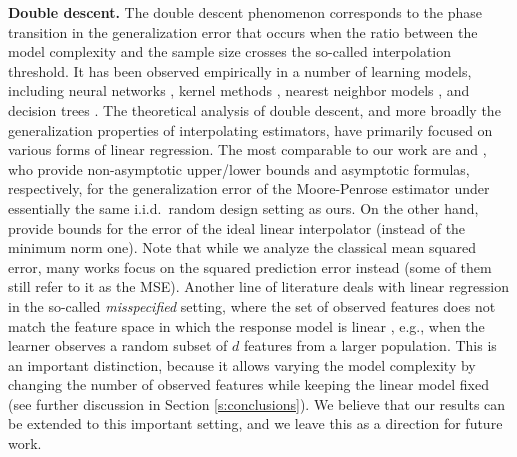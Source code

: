 \documentclass[11pt]{article}
\begin{document}
\textbf{Double descent.}
The double descent phenomenon \cite[a term introduced by][]{BHMM19}
corresponds to the phase transition in the generalization error that
occurs when the ratio between the model complexity and the
sample size crosses the so-called interpolation threshold. It has been observed empirically
in a number of learning models, including neural networks
\citep{BHMM19,GJSx19_TR}, kernel methods \citep{BMM18_TR,BRT18_TR},
nearest neighbor models \citep{BHM18_TR}, and decision trees \citep{BHMM19}. The
theoretical analysis of double descent, and more broadly the generalization
properties of interpolating estimators, have primarily focused on various forms of
linear regression. The most comparable
to our work are \cite{BLLT19_TR,LR18_TR} and \cite{HMRT19_TR}, who provide
non-asymptotic upper/lower bounds and asymptotic formulas,
respectively, for the generalization error of the Moore-Penrose
estimator under essentially the same i.i.d.~random design setting as
ours. On the other hand, \cite{MVSS19_TR} provide bounds for the error
of the ideal linear interpolator (instead of the minimum norm
one). Note that while we analyze the classical mean squared error, many
works focus on the squared prediction error instead (some of them still
refer to it as the MSE).
Another line of literature deals with linear regression in the
so-called \emph{misspecified} setting, where the set of observed
features does not match the feature space in
which the response model is linear
\citep{belkin2019two,HMRT19_TR,Mit19_TR,MM19_TR}, e.g., when the
learner observes a random subset of $d$ features from a larger
population. This is an important distinction,
because it allows varying the model complexity by changing the number
of observed features while keeping the linear model fixed (see further
discussion in Section \ref{s:conclusions}). We believe
that our results can be extended to this important setting, and we leave
this as a direction for future work.

\end{document}

